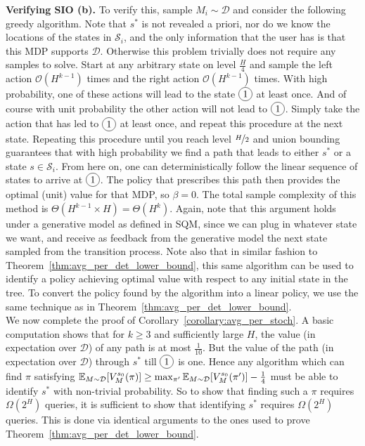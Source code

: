 \documentclass[11pt,twoside]{article}
\begin{document}
\noindent \textbf{Verifying SIO (b).} To verify this, sample $M_i \sim \mathcal{D}$ and consider the following greedy algorithm. Note that $s^*$ is not revealed a priori, nor do we know the locations of the states in $\mathcal{S}_i$, and the only information that the user has is that this MDP supports $\mathcal{D}$. Otherwise this problem trivially does not require any samples to solve. Start at any arbitrary state on level $\frac{H}{4}$ and sample the left action $\mathcal{O}(H^{k-1})$ times and the right action $\mathcal{O}(H^{k-1})$ times. With high probability, one of these actions will lead to the state $\circled{1}$ at least once. And of course with unit probability the other action will not lead to $\circled{1}$. Simply take the action that has led to $\circled{1}$ at least once, and repeat this procedure at the next state. Repeating this procedure until you reach level $\nicefrac{H}{2}$ and union bounding guarantees that with high probability we find a path that leads to either $s^*$ or a state $s \in \mathcal{S}_i$. From here on, one can deterministically follow the linear sequence of states to arrive at $\circled{1}$. The policy that prescribes this path then provides the optimal (unit) value for that MDP, so $\beta = 0$. The total sample complexity of this method is $\Theta(H^{k-1} \times H) = \Theta(H^k)$. Again, note that this argument holds under a generative model as defined in SQM, since we can plug in whatever state we want, and receive as feedback from the generative model the next state sampled from the transition process. Note also that in similar fashion to Theorem~\ref{thm:avg_per_det_lower_bound}, this same algorithm can be used to identify a policy achieving optimal value with respect to any initial state in the tree. To convert the policy found by the algorithm into a linear policy, we use the same technique as in Theorem~\ref{thm:avg_per_det_lower_bound}. \\

\noindent We now complete the proof of Corollary~\ref{corollary:avg_per_stoch}. A basic computation shows that for $k \geq 3$ and sufficiently large $H$, the value (in expectation over $\mathcal{D}$) of any path is at most $\frac{1}{10}$. But the value of the path (in expectation over $\mathcal{D}$) through $s^*$ till $\circled{1}$ is one. Hence any algorithm which can find $\pi$ satisfying $\operatorname{\mathbb{E}}_{M \sim \mathcal{D}} [V^{{s_0 }}_{{M }}({\pi})] \geq \max_{\pi'} \operatorname{\mathbb{E}}_{M \sim \mathcal{D}} [V^{{s_0 }}_{{M }}({\pi'})] - \frac{1}{4}$ must be able to identify $s^*$ with non-trivial probability. So to show that finding such a $\pi$ requires $\Omega(2^H)$ queries, it is sufficient to show that identifying $s^*$ requires $\Omega(2^H)$ queries. This is done via identical arguments to the ones used to prove Theorem~\ref{thm:avg_per_det_lower_bound}.
\end{document}
